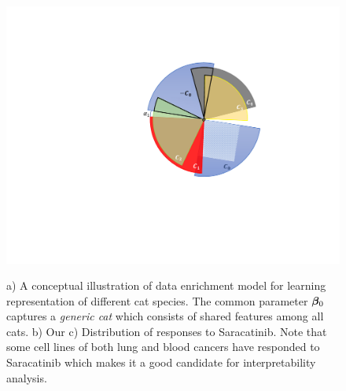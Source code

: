 \begin{figure}
\begin{minipage}[b][\heightfig][t]{0.3\linewidth}
		\parbox[b][\heightcapa][t]{1\linewidth}{\label{subfig1}}
		\includegraphics[height=\heightfigb]{./img/deric.pdf}
		\parbox[b][\heightcapb][t]{1\linewidth}{\label{subfig2}}
	\end{minipage}
	\caption{a) A conceptual illustration of data enrichment model for learning representation of  different cat species. The common parameter $\boldsymbol{\beta}_0$ captures a \emph{generic cat} which consists of shared features among all cats. b) Our  c) Distribution of responses to Saracatinib. Note that some cell lines of both lung and blood cancers have responded to Saracatinib which makes it a good candidate for interpretability analysis.}
	\label{fig}
\end{figure}


